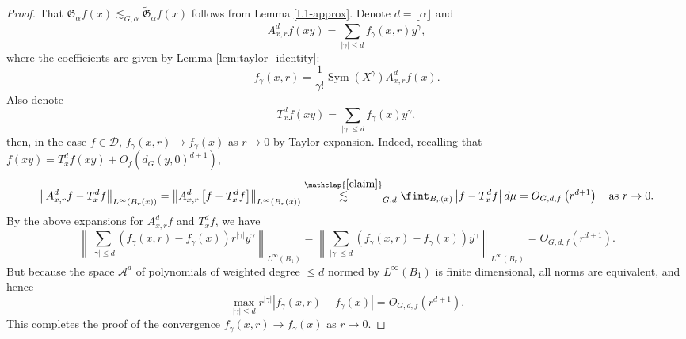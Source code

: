 \documentclass[11pt,reqno]{amsart}
\newcommand{\1}{\mathbf 1}
\begin{document}
\begin{proof}
That $\mathfrak{G}_\alpha f\left(x\right)\lesssim_{G,\alpha} \tilde{\mathfrak{G}}_\alpha f\left(x\right)$ follows from Lemma \ref{L1-approx}.
Denote $d=\lfloor\alpha\rfloor$ and
\[
A^d_{x,r}f\left(xy\right)=\sum_{\left|\gamma\right|\le d} f_\gamma\left(x,r\right)y^\gamma,
\]
where the coefficients are given by Lemma \ref{lem:taylor_identity}:
\[
f_\gamma \left(x,r\right)=\frac{1}{\gamma!}\operatorname{Sym}\left(X^\gamma\right)A^d_{x,r}f\left(x\right).
\]
Also denote
\[
T^d_{x}f\left(xy\right)=\sum_{\left|\gamma\right|\le d} f_\gamma \left(x\right)y^\gamma,
\]
then, in the case $f\in \mathcal{D}$, $f_\gamma \left(x,r\right)\to f_\gamma \left(x\right)$ as $r\to 0$ by Taylor expansion. Indeed, recalling that $f\left(xy\right)=T^d_{x}f\left(xy\right)+O_f\left(d_G\left(y,0\right)^{d+1}\right)$,
\[
\left\|A^d_{x,r}f-T^d_xf\right\|_{L^\infty\left(B_r\left(x\right)\right)}=\left\|A^d_{x,r}\left[f-T^d_xf\right]\right\|_{L^\infty\left(B_r\left(x\right)\right)}\stackrel{\mathclap{\eqref{claim}}}\lesssim_{G,d} \fint _{B_r\left(x\right)}\left|f-T^d_xf\right|d\mu=O_{G,d,f}\left(r^{d+1}\right) \quad \mathrm{as ~}r\to 0.
\]
By the above expansions for $A^d_{x,r}f$ and $T^d_xf$, we have
\[
\left\|\sum_{\left|\gamma\right|\le d}\left(f_\gamma\left(x,r\right)-f_\gamma\left(x\right)\right)r^{\left|\gamma\right|}y^\gamma\right\|_{L^\infty\left(B_1\right)}=\left\|\sum_{\left|\gamma\right|\le d}\left(f_\gamma\left(x,r\right)-f_\gamma\left(x\right)\right)y^\gamma\right\|_{L^\infty\left(B_r\right)}=O_{G,d,f}\left(r^{d+1}\right).
\]
But because the space $\mathcal{A}^d$ of polynomials of weighted degree $\le d$ normed by $L^\infty\left(B_1\right)$ is finite dimensional, all norms are equivalent, and hence
\[
\max_{\left|\gamma\right|\le d}r^{\left|\gamma\right|}\left| f_\gamma\left(x,r\right)-f_\gamma\left(x\right)\right|=O_{G,d,f}\left( r^{d+1}\right).
\]
This completes the proof of the convergence $f_\gamma\left(x,r\right)\to f_\gamma\left(x\right)$ as $r\to 0$.


\end{proof}
\end{document}
